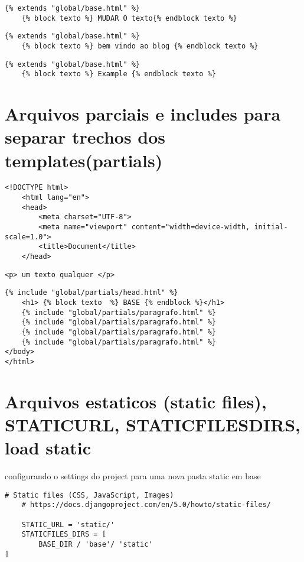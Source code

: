 \documentclass{article}
\begin{document}
\begin{lstlisting}[style=htmlStyle, caption={home/templates/home.html}]
    {% extends "global/base.html" %}
    {% block texto %} MUDAR O texto{% endblock texto %}
\end{lstlisting}


\begin{lstlisting}[style=htmlStyle, caption={blog/templates/blog.html}]
    {% extends "global/base.html" %}
    {% block texto %} bem vindo ao blog {% endblock texto %}
\end{lstlisting}


\begin{lstlisting}[style=htmlStyle, caption={blog/templates/example.html}]
    {% extends "global/base.html" %}
    {% block texto %} Example {% endblock texto %}
\end{lstlisting}
\section{Arquivos parciais e includes para separar trechos dos templates(partials)}
\textbf{}
\begin{lstlisting}[style=htmlStyle, caption={base/global/partials/head.html}]
        <!DOCTYPE html>
    <html lang="en">
    <head>
        <meta charset="UTF-8">
        <meta name="viewport" content="width=device-width, initial-scale=1.0">
        <title>Document</title>
    </head>
\end{lstlisting}
\begin{lstlisting}[style=htmlStyle, caption={base/global/partials/paragrafo.html}]
    <p> um texto qualquer </p>
\end{lstlisting}


\begin{lstlisting}[style=htmlStyle, caption={base/global/base.html}]
    {% include "global/partials/head.html" %}
    <h1> {% block texto  %} BASE {% endblock %}</h1>
    {% include "global/partials/paragrafo.html" %}
    {% include "global/partials/paragrafo.html" %}
    {% include "global/partials/paragrafo.html" %}
    {% include "global/partials/paragrafo.html" %}
</body>
</html>
\end{lstlisting}

\section{Arquivos estaticos (static files), STATICURL, STATICFILESDIRS,  load static}
configurando o settings do project para uma nova pasta static em base
\begin{lstlisting}[style=pythonStyle, caption={project/settings.py}]
    # Static files (CSS, JavaScript, Images)
    # https://docs.djangoproject.com/en/5.0/howto/static-files/

    STATIC_URL = 'static/'
    STATICFILES_DIRS = [
        BASE_DIR / 'base'/ 'static'
]
\end{lstlisting}
\end{document}
